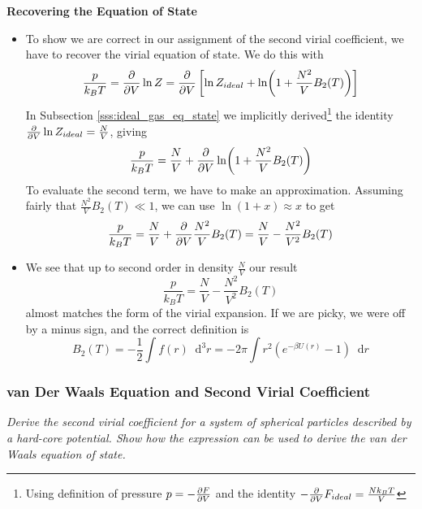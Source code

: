 \documentclass[11pt, a4paper]{article}
\newcommand{\diff}{\mathop{}\!\mathrm{d}} %
\begin{document}
\textbf{Recovering the Equation of State}
\begin{itemize}
	\item To show we are correct in our assignment of the second virial coefficient, we have to recover the virial equation of state. We do this with
	\begin{equation*}
		\frac{p}{k_{B}T} = \pdv{}{V}\ln Z = \pdv{}{V} \left[\ln Z_{ideal} + \ln(1 + \frac{N^{2}}{V} B_{2}(T)) \right]
	\end{equation*}
	In Subsection \ref{sss:ideal_gas_eq_state} we implicitly derived\footnote{Using definition of pressure $ p = -\pdv{F}{V} $ and the identity $ -\pdv{}{V} F_{ideal} = \frac{Nk_{B}T}{V} $ } the identity $  \pdv{}{V}\ln Z_{ideal} = \frac{N}{V} $, giving
	\begin{equation*}
		\frac{p}{k_{B}T} = \frac{N}{V} +  \pdv{}{V}\ln(1 + \frac{N^{2}}{V} B_{2}(T)) 
	\end{equation*}
	To evaluate the second term, we have to make an approximation. Assuming fairly that $ \frac{N^{2}}{V} B_{2}(T) \ll 1 $, we can use $ \ln (1 + x) \approx x $ to get
	\begin{equation*}
		\frac{p}{k_{B}T} = \frac{N}{V} +  \pdv{}{V}\frac{N^{2}}{V} B_{2}(T) = \frac{N}{V} - \frac{N^{2}}{V^{2}} B_{2}(T)
	\end{equation*}

	\item We see that up to second order in density $ \frac{N}{V} $ our result 
	\begin{equation*}
		\frac{p}{k_{B}T} = \frac{N}{V} - \frac{N^{2}}{V^{2}} B_{2}(T)
	\end{equation*}
	almost matches the form of the virial expansion. If we are picky, we were off by a minus sign, and the correct definition is
	\begin{equation*}
		B_{2}(T) = - \frac{1}{2} \int f(r)\diff^{3} r = - 2\pi \int r^{2} \left (e^{-\beta U(r)} - 1\right ) \diff r
	\end{equation*}

	
	
\end{itemize}

\subsubsection{van Der Waals Equation and Second Virial Coefficient} \label{sss:vdW_derivation}
\textit{Derive the second virial coefficient for a system of spherical particles described by a hard-core potential. Show how the expression can be used to derive the van der Waals equation of state.}
\end{document}
